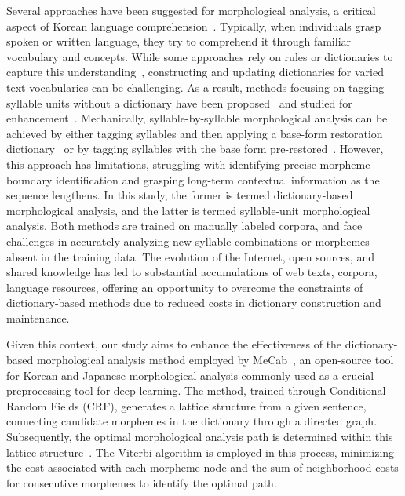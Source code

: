 \documentclass[AMS,STIX2COL]{WileyNJD-v2}
\begin{document}
    Several approaches have been suggested for morphological analysis, a critical aspect of Korean language comprehension~\cite{KwonHC1991, LeeDG2009, ShimKS2011, LeeJS2011, ShinJC2012, LeeCK2013, NaSH2014, NaSH2015, HwangHS2016, KimHM2016, ChungES2016, LeeCH2016, Li2017, NaSH2018, KimSW2018, ChoiYS2018, MinJW2018, MinJW2019, KimHM2019, SongHJ2019, MinJW2020, SongHJ2020, ChoiYS2020, HwangHS2020, KimHJ2021, YounJY2021, MinJW2022, KimJM2022, ShinHJ2023}.
    Typically, when individuals grasp spoken or written language, they try to comprehend it through familiar vocabulary and concepts.
    While some approaches rely on rules or dictionaries to capture this understanding~\cite{KwonHC1991}, constructing and updating dictionaries for varied text vocabularies can be challenging.
    As a result, methods focusing on tagging syllable units without a dictionary have been proposed~\cite{ShimKS2011, LeeCK2013, LeeCH2016, KimHM2016} and studied for enhancement~\cite{KimSW2018, ChoiYS2018, KimHM2019, MinJW2019, SongHJ2019, SongHJ2020, YounJY2021, ShinHJ2023}.
    Mechanically, syllable-by-syllable morphological analysis can be achieved by either tagging syllables and then applying a base-form restoration dictionary~\cite{ShimKS2011, LeeCH2016} or by tagging syllables with the base form pre-restored~\cite{YounJY2021}.
    However, this approach has limitations, struggling with identifying precise morpheme boundary identification and grasping long-term contextual information as the sequence lengthens.
    In this study, the former is termed dictionary-based morphological analysis, and the latter is termed syllable-unit morphological analysis.
    Both methods are trained on manually labeled corpora, and face challenges in accurately analyzing new syllable combinations or morphemes absent in the training data.
    The evolution of the Internet, open sources, and shared knowledge has led to substantial accumulations of web texts, corpora, language resources, offering an opportunity to overcome the constraints of dictionary-based methods due to reduced costs in dictionary construction and maintenance.

    Given this context, our study aims to enhance the effectiveness of the dictionary-based morphological analysis method employed by MeCab~\cite{MeCab}, an open-source tool for Korean and Japanese morphological analysis commonly used as a crucial preprocessing tool for deep learning.
    The method, trained through Conditional Random Fields (CRF), generates a lattice structure from a given sentence, connecting candidate morphemes in the dictionary through a directed graph.
    Subsequently, the optimal morphological analysis path is determined within this lattice structure~\cite{Kudo2004, NaSH2014, NaSH2018}.
    The Viterbi algorithm is employed in this process, minimizing the cost associated with each morpheme node and the sum of neighborhood costs for consecutive morphemes to identify the optimal path.
\end{document}
